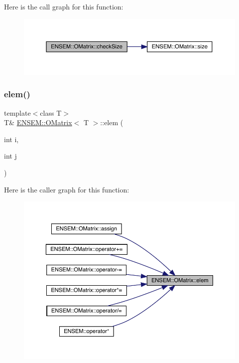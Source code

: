Here is the call graph for this function\+:
\nopagebreak
\begin{figure}[H]
\begin{center}
\leavevmode
\includegraphics[width=350pt]{dd/d80/classENSEM_1_1OMatrix_a8e4c3a86b8055f6e67c8fd914b2898ca_cgraph}
\end{center}
\end{figure}
\mbox{\label{classENSEM_1_1OMatrix_a0a15388ff6dc8159664f6dc14a35b399}} 
\subsubsection{\texorpdfstring{elem()}{elem()}\hspace{0.1cm}{\footnotesize\ttfamily [1/6]}}
{\footnotesize\ttfamily template$<$class T$>$ \\
T\& \mbox{\hyperlink{classENSEM_1_1OMatrix}{E\+N\+S\+E\+M\+::\+O\+Matrix}}$<$ T $>$\+::elem (\begin{DoxyParamCaption}\item[{int}]{i,  }\item[{int}]{j }\end{DoxyParamCaption})\hspace{0.3cm}{\ttfamily [inline]}}

Here is the caller graph for this function\+:
\nopagebreak
\begin{figure}[H]
\begin{center}
\leavevmode
\includegraphics[width=350pt]{dd/d80/classENSEM_1_1OMatrix_a0a15388ff6dc8159664f6dc14a35b399_icgraph}
\end{center}
\end{figure}
\mbox{\label{classENSEM_1_1OMatrix_a0a15388ff6dc8159664f6dc14a35b399}} 
